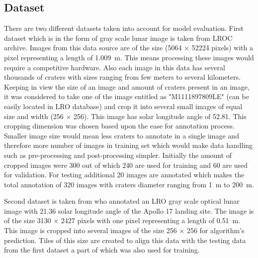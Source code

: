 \documentclass[11pt]{article}
\begin{document}
\subsection{Dataset}
There are two different datasets taken into account for model evaluation. First dataset which is in the form of gray scale lunar image is taken from LROC archive. Images from this data source are of the size (5064 $\times$ 52224 pixels) with a pixel representing a length of \SI{1.009}{m}. This means processing these images would require a competitive hardware. Also each image in this data has several thousands of craters with sizes ranging from few meters to several kilometers. Keeping in view the size of an image and amount of craters present in an image, it was considered to take one of the image entitled as "M1111897809LE" (can be easily located in LRO database) and crop it into several small images of equal size and width (256 $\times$ 256). This image has solar longitude angle of 52.81\textdegree. This cropping dimension was chosen based upon the ease for annotation process. Smaller image size would mean less craters to annotate in a single image and therefore more number of images in training set which would make data handling such as pre-processing and post-processing simpler. Initially the amount of cropped images were 300 out of which 240 are used for training and 60 are used for validation. For testing additional 20 images are annotated which makes the total annotation of 320 images with craters diameter ranging from \SI{1}{m} to \SI{200}{m}. 

Second dataset is taken from \cite{dino2020} who annotated an LRO gray scale optical lunar image with 21.36\textdegree{} solar longitude angle of the Apollo 17 landing site. The image is of the size 3130 $\times$ 2427 pixels with one pixel representing a length of \SI{0.51}{m}. This image is cropped into several images of the size 256 $\times$ 256 for algorithm's prediction. Tiles of this size are created to align this data with the testing data from the first dataset a part of which was also used for training.

\end{document}
